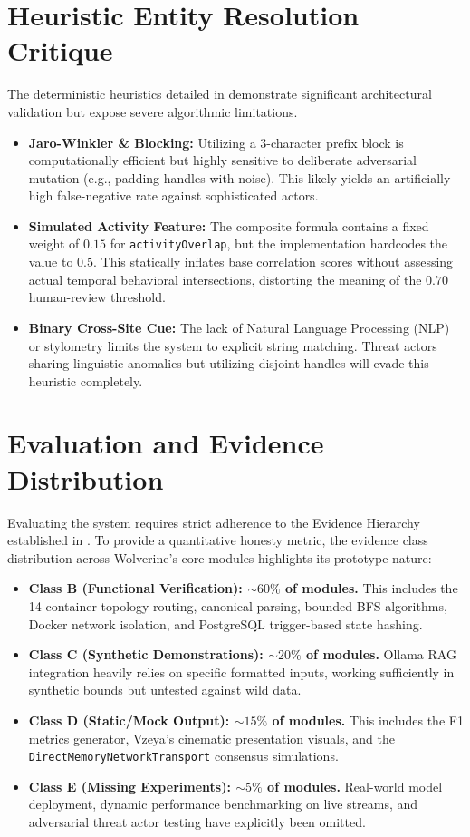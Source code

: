 \section{Heuristic Entity Resolution Critique}
\label{sec:disc-resolution-critique}
The deterministic heuristics detailed in  demonstrate significant architectural validation but expose severe algorithmic limitations.

\begin{itemize}
    \item \textbf{Jaro-Winkler \& Blocking:} Utilizing a 3-character prefix block is computationally efficient but highly sensitive to deliberate adversarial mutation (e.g., padding handles with noise). This likely yields an artificially high false-negative rate against sophisticated actors.
    \item \textbf{Simulated Activity Feature:} The composite formula contains a fixed weight of $0.15$ for \texttt{activityOverlap}, but the implementation hardcodes the value to $0.5$. This statically inflates base correlation scores without assessing actual temporal behavioral intersections, distorting the meaning of the $0.70$ human-review threshold.
    \item \textbf{Binary Cross-Site Cue:} The lack of Natural Language Processing (NLP) or stylometry limits the system to explicit string matching. Threat actors sharing linguistic anomalies but utilizing disjoint handles will evade this heuristic completely.
\end{itemize}

\section{Evaluation and Evidence Distribution}
\label{sec:disc-eval-interpretation}
Evaluating the system requires strict adherence to the Evidence Hierarchy established in . To provide a quantitative honesty metric, the evidence class distribution across Wolverine's core modules highlights its prototype nature:

\begin{itemize}
    \item \textbf{Class B (Functional Verification): $\sim60\%$ of modules.} This includes the 14-container topology routing, canonical parsing, bounded BFS algorithms, Docker network isolation, and PostgreSQL trigger-based state hashing. 
    \item \textbf{Class C (Synthetic Demonstrations): $\sim20\%$ of modules.} Ollama RAG integration heavily relies on specific formatted inputs, working sufficiently in synthetic bounds but untested against wild data.
    \item \textbf{Class D (Static/Mock Output): $\sim15\%$ of modules.} This includes the F1 metrics generator, Vzeya's cinematic presentation visuals, and the \texttt{DirectMemoryNetworkTransport} consensus simulations.
    \item \textbf{Class E (Missing Experiments): $\sim5\%$ of modules.} Real-world model deployment, dynamic performance benchmarking on live streams, and adversarial threat actor testing have explicitly been omitted.
\end{itemize}

